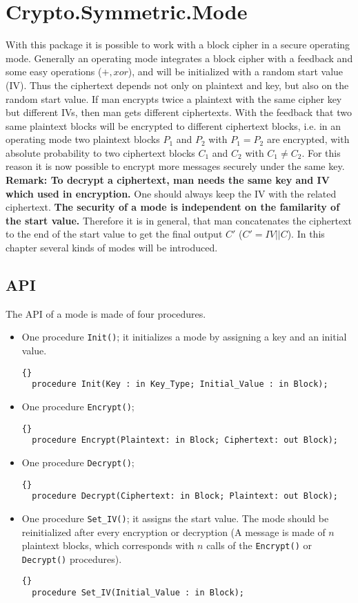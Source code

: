 \chapter{Crypto.Symmetric.Mode}\label{Mode}
With this package it is possible to work with a block cipher in a secure operating mode. Generally an operating mode integrates a block cipher with a feedback and some easy operations ($+,xor$), and will be initialized with a random start value (IV). Thus the ciphertext depends not only on plaintext and key, but also on the random start value. If man encrypts twice a plaintext with the same cipher key but different IVs, then man gets different ciphertexts. With the feedback that two same plaintext blocks will be encrypted to different ciphertext blocks, i.e. in an operating mode two plaintext blocks $P_1$ and $P_2$ with $P_1=P_2$ are encrypted, with absolute probability to two ciphertext blocks $C_1$ and $C_2$ with $C_1\neq C_2$. For this reason it is now possible to encrypt more messages securely under the same key.\\
\textbf{Remark: To decrypt a ciphertext, man needs the same key and IV which used in encryption.} One should always keep the IV with the related ciphertext. \textbf{The security of a mode is independent on the familarity of the start value.} Therefore it is in general, that man concatenates the ciphertext to the end of the start value to get the final output $C'$ ($C'=IV||C$). In this chapter several kinds of modes will be introduced.
\section{API}\label{API-Mode}
The API of a mode is made of four procedures.
\begin{itemize}
\item One procedure \texttt{Init()}; it initializes a mode by assigning a key and an initial value.
\begin{lstlisting}{}
  procedure Init(Key : in Key_Type; Initial_Value : in Block);
\end{lstlisting}
\item One procedure \texttt{Encrypt()}; 
\begin{lstlisting}{}
  procedure Encrypt(Plaintext: in Block; Ciphertext: out Block);
\end{lstlisting}
\item One procedure \texttt{Decrypt()};
\begin{lstlisting}{}
  procedure Decrypt(Ciphertext: in Block; Plaintext: out Block);
\end{lstlisting}
\item One procedure \texttt{Set\_IV()}; it assigns the start value. The mode should be reinitialized after every encryption or decryption (A message is made of $n$ plaintext blocks, which corresponds with $n$ calls of the \texttt{Encrypt()} or \texttt{Decrypt()} procedures).
\begin{lstlisting}{}
  procedure Set_IV(Initial_Value : in Block);
\end{lstlisting}
\end{itemize}
